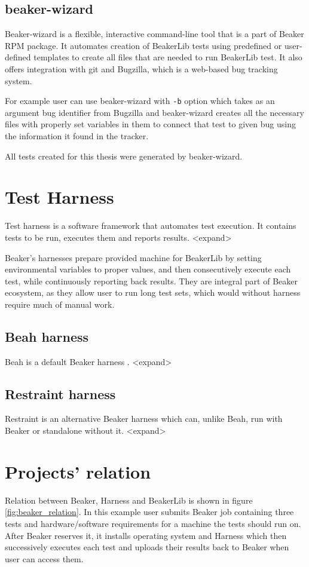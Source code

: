 \subsection{beaker-wizard}
Beaker-wizard is a flexible, interactive command-line tool that is a part of Beaker RPM package. It automates creation of BeakerLib tests using predefined or user-defined templates to create all files that are needed to run BeakerLib test.  It also offers integration with git and Bugzilla, which is a web-based bug tracking system.

For example user can use beaker-wizard with \texttt{-b} option which takes as an argument bug identifier from Bugzilla and beaker-wizard creates all the necessary files with properly set variables in them to connect that test to given bug using the information it found in the tracker.

All tests created for this thesis were generated by beaker-wizard.

\section{Test Harness}
Test harness is a software framework that automates test execution. It contains tests to be run, executes them and reports results. <expand>

Beaker’s harnesses prepare provided machine for BeakerLib by setting environmental variables to proper values, and then consecutively execute each test, while continuously reporting back results. They are integral part of Beaker ecosystem, as they allow user to run long test sets, which would without harness require much of manual work.

\subsection{Beah harness}
Beah \cite{beah_doc} is a default Beaker harness . <expand> 

\subsection{Restraint harness}
Restraint \cite{restraint_doc} is an alternative Beaker harness which can, unlike Beah, run with Beaker or standalone without it. <expand>

\section{Projects' relation}
Relation between Beaker, Harness and BeakerLib is shown in figure \ref{fig:beaker_relation}. In this example user submits Beaker job containing three tests and hardware/software requirements for a machine the tests should run on. After Beaker reserves it, it installs operating system and Harness which then successively executes each test and uploads their results back to Beaker when user can access them.

